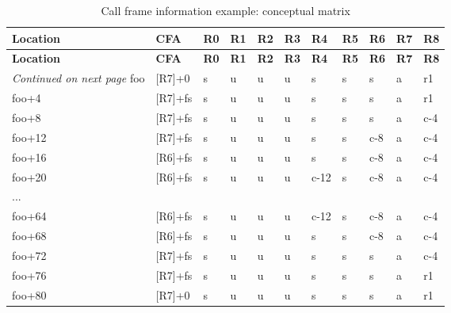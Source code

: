 \begin{centering}
\setlength{\extrarowheight}{0.1cm}
\begin{longtable}{l|llllllllll}
  \caption{Call frame information example: conceptual matrix} 
  \label{tab:callframeinformationexampleconceptualmatrix} \\
  \hline \bfseries Location & \bfseries CFA & \bfseries R0 & \bfseries R1 & \bfseries R2 & \bfseries R3 & \bfseries R4 & \bfseries R5 & \bfseries R6 & \bfseries R7 & \bfseries R8 \\ \hline
\endfirsthead
  \bfseries Location &\bfseries CFA &\bfseries R0 & \bfseries R1 & \bfseries R2 &\bfseries R3 &\bfseries R4 &\bfseries R5 &\bfseries R6 &\bfseries R7 &\bfseries R8\\ \hline
\endhead
  \hline \emph{Continued on next page}
\endfoot
  \hline
\endlastfoot
foo&[R7]+0&s&u&u&u&s&s&s&a&r1 \\
foo+4&[R7]+fs&s&u&u&u&s&s&s&a&r1 \\
foo+8&[R7]+fs&s&u&u&u&s&s&s&a&c-4 \\
foo+12&[R7]+fs&s&u&u&u&s&s&c-8&a&c-4 \\
foo+16&[R6]+fs&s&u&u&u&s&s&c-8&a&c-4 \\
foo+20&[R6]+fs&s&u&u&u&c-12&s&c-8&a&c-4 \\
...&&&&&&&&&& \\
foo+64&[R6]+fs&s&u&u&u&c-12&s&c-8&a&c-4 \\
foo+68&[R6]+fs&s&u&u&u&s&s&c-8&a&c-4  \\
foo+72&[R7]+fs&s&u&u&u&s&s&s&a&c-4  \\
foo+76&[R7]+fs&s&u&u&u&s&s&s&a&r1 \\
foo+80&[R7]+0&s&u&u&u&s&s&s&a&r1 \\
\end{longtable}
\end{centering}

\clearpage      %

